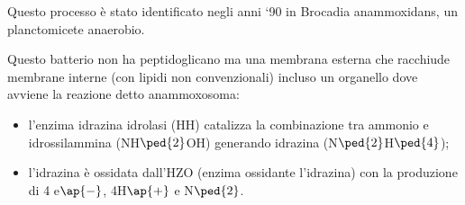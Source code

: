 \documentclass[11pt]{book}
\begin{document}
Questo processo è stato identificato negli anni ‘90 in Brocadia anammoxidans, un planctomicete anaerobio.

Questo batterio non ha peptidoglicano ma una membrana esterna che racchiude membrane interne (con lipidi non convenzionali) incluso un organello dove avviene la reazione detto anammoxosoma:
\begin{itemize}
\item l’enzima idrazina idrolasi (HH) catalizza la combinazione tra ammonio e idrossilammina (NH$\ped{2}$OH) generando idrazina (N$\ped{2}$H$\ped{4}$); 
\item l’idrazina è ossidata dall’HZO (enzima ossidante l’idrazina) con la produzione di 4 e$\ap{-}$, 4H$\ap{+}$ e N$\ped{2}$.
\end{itemize}
\end{document}

